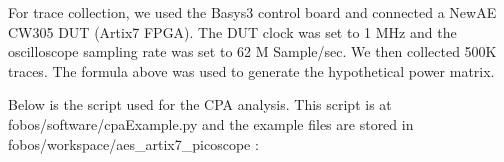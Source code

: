 \documentclass[letterpaper,10pt,english]{sphinxmanual}
\begin{document}
For trace collection, we used the Basys3 control board and connected a NewAE CW305 DUT (Artix7 FPGA).
The DUT clock was set to 1 MHz and the oscilloscope sampling rate was set to 62 M Sample/sec.
We then collected 500K traces.
The formula above was used to generate the hypothetical power matrix.

Below is the script used for the CPA analysis. This script is at fobos/software/cpaExample.py and the example files are
stored in fobos/workspace/aes\_artix7\_picoscope :

\begin{sphinxVerbatim}[commandchars=\\\{\},numbers=left,firstnumber=1,stepnumber=1]
 
   
   
   
   
   
   


\end{sphinxVerbatim}
\end{document}
